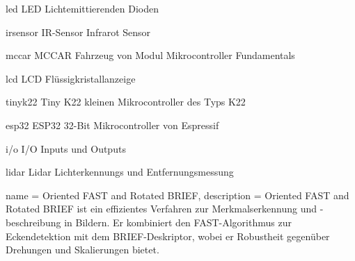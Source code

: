 \newacronym
  {led}                 %
  {LED}                %
  {Lichtemittierenden Dioden}  %


\newacronym
  {irsensor}                 %
  {IR-Sensor}                %
  {Infrarot Sensor}  %

\newacronym
  {mccar}                 %
  {MCCAR}                %
  {Fahrzeug von Modul Mikrocontroller Fundamentals}  %


\newacronym
  {lcd}                 %
  {LCD}                %
  {Flüssigkristallanzeige}  %


\newacronym
  {tinyk22}                 %
  {Tiny K22}                %
  {kleinen Mikrocontroller des Typs K22}  %

\newacronym
  {esp32}                 %
  {ESP32}                %
  {32-Bit Mikrocontroller von Espressif}  %

\newacronym
  {i/o}                 %
  {I/O}                %
  {Inputs und Outputs}  %


\newacronym
  {lidar}             %
  {Lidar}                      %
  {Lichterkennungs und Entfernungsmessung}             %

{
  name = Oriented FAST and Rotated BRIEF,
  description = {
 Oriented FAST and Rotated BRIEF ist ein effizientes Verfahren zur Merkmalserkennung und -beschreibung in Bildern. Er kombiniert den FAST-Algorithmus zur Eckendetektion mit dem BRIEF-Deskriptor, wobei er Robustheit gegenüber Drehungen und Skalierungen bietet.
  }
}